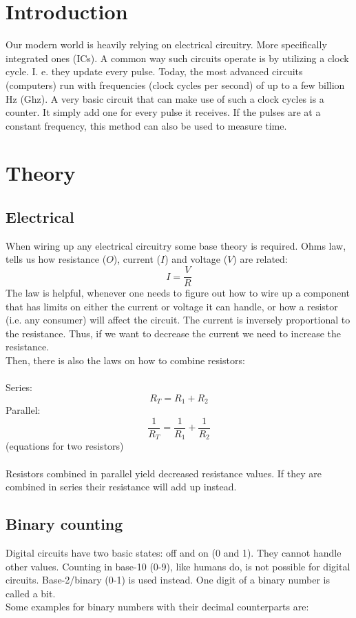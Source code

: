 \documentclass[fleqn,14pt]{article}
\begin{document}
\section{Introduction}
Our modern world is heavily relying on electrical circuitry. More specifically integrated ones (ICs).
A common way such circuits operate is by utilizing a clock cycle. I. e. they update every pulse.
Today, the most advanced circuits (computers) run with frequencies (clock cycles per second) of up to
a few billion Hz (Ghz). A very basic circuit that can make use of such a clock cycles is a counter.
It simply add one for every
pulse it receives. If the pulses are at a constant frequency, this method can also be used to measure time.

\section{Theory}
\subsection{Electrical}

When wiring up any electrical circuitry some base theory is required. Ohms law,
tells us how resistance ($O$),
current ($I$) and voltage ($V$) are related:
$$
I = \frac{V}{R}
$$
The law is helpful, whenever one needs to figure out how to wire up a component that has limits
on either the current or voltage it can handle,
or how a resistor (i.e. any consumer) will affect the circuit. The current
is inversely proportional to the resistance. Thus, if we want to decrease the current we need
to increase the resistance.\\
Then, there is also the laws on how to combine resistors: \\
\\
Series:
$$
R_T = R_1 + R_2
$$
Parallel:
$$
\frac{1}{R_T} = \frac{1}{R_1} + \frac{1}{R_2}
$$
(equations for two resistors)\\
\\
Resistors combined in parallel yield decreased resistance values.
If they are combined in series their resistance will add up instead.

\subsection{Binary counting}
Digital circuits have two basic states: off and on (0 and 1). They cannot handle other values.
Counting in base-10 (0-9), like humans do, is not possible for digital circuits. Base-2/binary (0-1) is used 
instead. One digit of a binary number is called a bit.\\
Some examples for binary numbers with
their decimal counterparts are:
\end{document}
